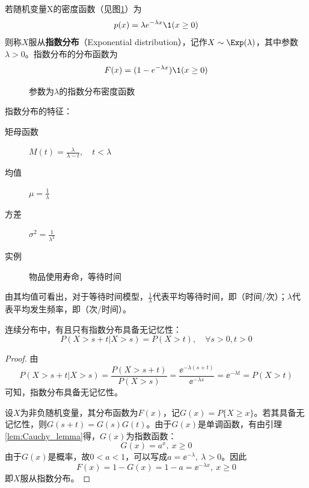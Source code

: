 \begin{definition}
    若随机变量X的密度函数（见图\ref{fig:exponential_pdf}）为
    \[ p(x) = \lambda e^{-\lambda x} \1(x \ge 0) \]
    则称$X$服从\textbf{指数分布}（Exponential distribution），记作$X\sim \Exp(\lambda)$，其中参数$\lambda>0$。指数分布的分布函数为
    \[ F(x) = (1 - e^{-\lambda x})\1(x \ge 0) \]
\end{definition}

\begin{figure}[!ht]
    \centering
    \caption{参数为$\lambda$的指数分布密度函数}\label{fig:exponential_pdf}
\end{figure}

指数分布的特征：
\begin{description}
    \item[矩母函数] $M(t)=\frac{\lambda}{\lambda-t} , \quad t < \lambda$
    \item[均值] $\mu=\frac{1}{\lambda}$
    \item[方差] $\sigma^2=\frac{1}{\lambda^{2}}$
    \item[实例] 物品使用寿命，等待时间
\end{description}

\begin{remark}
    由其均值可看出，对于等待时间模型，$\frac{1}{\lambda}$代表平均等待时间，即（时间/次）；$\lambda$代表平均发生频率，即（次/时间）。
\end{remark}

\begin{theorem}[指数分布的无记忆性]
    连续分布中，有且只有指数分布具备无记忆性：
    \[ P(X > s + t| X > s) = P( X > t) ,\quad \forall s>0,t>0\]
\end{theorem}
\begin{proof}
    由
    \[ P(X>s+t | X>s) = \frac{P(X>s+t)}{P(X>s)} = \frac{\ee^{-\lambda(s+t)}}{\ee^{-\lambda s}} = \ee^{-\lambda t} =P(X>t) \]
    可知，指数分布具备无记忆性。

    设$X$为非负随机变量，其分布函数为$F(x)$，记$G(x)=P\{ X\ge x \}$。若其具备无记忆性，则$G(s+t)=G(s)G(t)$。由于$G(x)$是单调函数，有由引理\ref{lem:Cauchy_lemma}得，$G(x)$为指数函数：
    \[ G(x)=a^x,\ x\ge 0 \]
    由于$G(x)$是概率，故$0<a<1$，可以写成$a=\ee^{-\lambda},\ \lambda > 0$。因此
    \[ F(x)=1-G(x)=1-a=\ee^{-\lambda x},\ x\ge 0 \]
    即$X$服从指数分布。
\end{proof}

